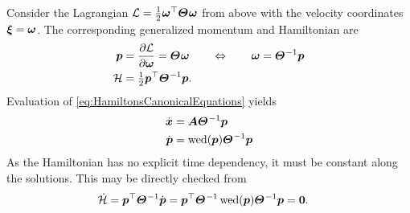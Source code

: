 \begin{Example}
Consider the Lagrangian $\Lagrangian = \tfrac{1}{2} \w^\top \bodyMOI{}{} \w$ from above with the velocity coordinates $\boldsymbol{\xi} = \boldsymbol{\omega}$.
The corresponding generalized momentum and Hamiltonian are
\begin{align}
 \genMomentum &= \pdiff[\Lagrangian]{\w} = \bodyMOI{}{} \w
\qquad \Leftrightarrow \qquad 
 \w = \bodyMOI{}{}^{-1} \genMomentum
\\
 \Hamiltonian &= \tfrac{1}{2} \genMomentum^\top \bodyMOI{}{}^{-1} \genMomentum.
\end{align}
Evaluation of \eqref{eq:HamiltonsCanonicalEquations} yields
\begin{subequations}
\begin{align}
 \sysCoordd &= \kinMat \bodyMOI{}{}^{-1} \genMomentum
\\
 \dot{\genMomentum} &= \wedOp(\genMomentum) \bodyMOI{}{}^{-1} \genMomentum
\end{align}
\end{subequations}
As the Hamiltonian has no explicit time dependency, it must be constant along the solutions.
This may be directly checked from
\begin{align}
 \dot{\Hamiltonian} &= \genMomentum^\top \bodyMOI{}{}^{-1} \dot{\genMomentum}
 = \genMomentum^\top \bodyMOI{}{}^{-1} \wedOp(\genMomentum) \bodyMOI{}{}^{-1} \genMomentum
 = \tuple{0}.
\end{align}

\end{Example}
